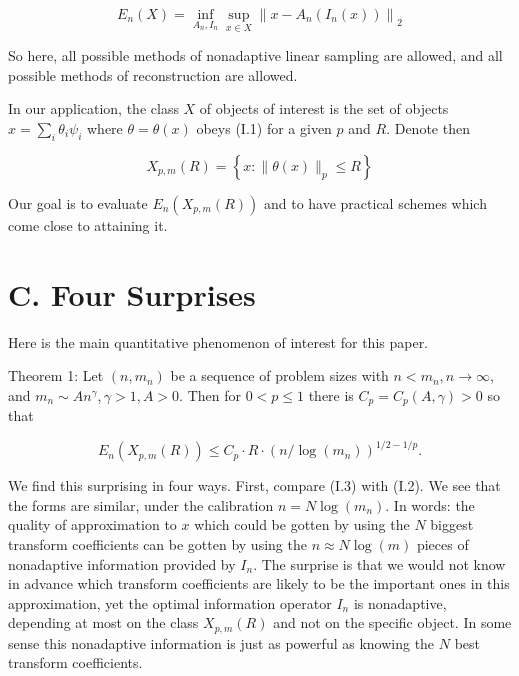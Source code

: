 \documentclass[10pt]{article}
\begin{document}
$$
E_{n}(X)=\inf _{A_{n}, I_{n}} \sup _{x \in X}\left\|x-A_{n}\left(I_{n}(x)\right)\right\|_{2}
$$

So here, all possible methods of nonadaptive linear sampling are allowed, and all possible methods of reconstruction are allowed.

In our application, the class $X$ of objects of interest is the set of objects $x=\sum_{i} \theta_{i} \psi_{i}$ where $\theta=\theta(x)$ obeys (I.1) for a given $p$ and $R$. Denote then

$$
X_{p, m}(R)=\left\{x:\|\theta(x)\|_{p} \leq R\right\}
$$

Our goal is to evaluate $E_{n}\left(X_{p, m}(R)\right)$ and to have practical schemes which come close to attaining it.

\section*{C. Four Surprises}
Here is the main quantitative phenomenon of interest for this paper.

Theorem 1: Let $\left(n, m_{n}\right)$ be a sequence of problem sizes with $n<m_{n}, n \rightarrow \infty$, and $m_{n} \sim A n^{\gamma}, \gamma>1, A>0$. Then for $0<p \leq 1$ there is $C_{p}=C_{p}(A, \gamma)>0$ so that


\begin{equation*}
E_{n}\left(X_{p, m}(R)\right) \leq C_{p} \cdot R \cdot\left(n / \log \left(m_{n}\right)\right)^{1 / 2-1 / p} . \tag{I.3}
\end{equation*}


We find this surprising in four ways. First, compare (I.3) with (I.2). We see that the forms are similar, under the calibration $n=N \log \left(m_{n}\right)$. In words: the quality of approximation to $x$ which could be gotten by using the $N$ biggest transform coefficients can be gotten by using the $n \approx N \log (m)$ pieces of nonadaptive information provided by $I_{n}$. The surprise is that we would not know in advance which transform coefficients are likely to be the important ones in this approximation, yet the optimal information operator $I_{n}$ is nonadaptive, depending at most on the class $X_{p, m}(R)$ and not on the specific object. In some sense this nonadaptive information is just as powerful as knowing the $N$ best transform coefficients.
\end{document}
